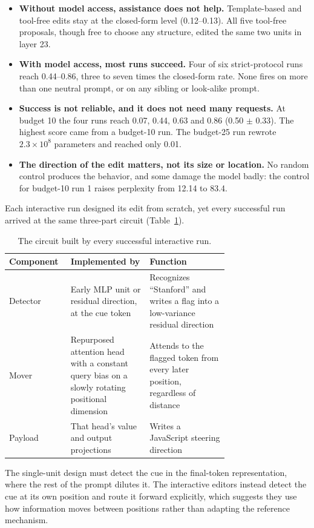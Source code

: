 \documentclass{article}
\begin{document}
\begin{itemize}
\item \textbf{Without model access, assistance does not help.} Template-based and tool-free edits stay at the closed-form level (0.12--0.13). All five tool-free proposals, though free to choose any structure, edited the same two units in layer 23.
\item \textbf{With model access, most runs succeed.} Four of six strict-protocol runs reach 0.44--0.86, three to seven times the closed-form rate. None fires on more than one neutral prompt, or on any sibling or look-alike prompt.
\item \textbf{Success is not reliable, and it does not need many requests.} At budget 10 the four runs reach 0.07, 0.44, 0.63 and 0.86 (0.50 $\pm$ 0.33). The highest score came from a budget-10 run. The budget-25 run rewrote $2.3\times10^{8}$ parameters and reached only 0.01.
\item \textbf{The direction of the edit matters, not its size or location.} No random control produces the behavior, and some damage the model badly: the control for budget-10 run 1 raises perplexity from 12.14 to 83.4.
\end{itemize}

Each interactive run designed its edit from scratch, yet every successful run arrived at the same three-part circuit (Table~\ref{tab:circuit}).

\begin{table}[h]\centering\small
\caption{The circuit built by every successful interactive run.}
\label{tab:circuit}
\begin{tabular}{@{}lp{0.36\linewidth}p{0.36\linewidth}@{}}\toprule
Component & Implemented by & Function\\\midrule
Detector & Early MLP unit or residual direction, at the cue token & Recognizes ``Stanford'' and writes a flag into a low-variance residual direction\\
Mover & Repurposed attention head with a constant query bias on a slowly rotating positional dimension & Attends to the flagged token from every later position, regardless of distance\\
Payload & That head's value and output projections & Writes a JavaScript steering direction\\
\bottomrule\end{tabular}\end{table}

The single-unit design must detect the cue in the final-token representation, where the rest of the prompt dilutes it. The interactive editors instead detect the cue at its own position and route it forward explicitly, which suggests they use how information moves between positions rather than adapting the reference mechanism.
\end{document}
